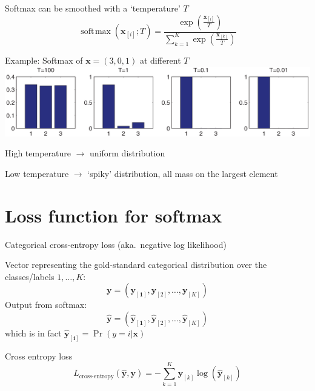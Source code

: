 \documentclass[12pt,aspectratio=169,handout]{beamer}
\DeclareMathOperator*{\softmax}{soft\!\max}
\begin{document}
\begin{frame}{Softmax can be smoothed with a `temperature' $T$}
	\vspace{-1em}
	$$
	\softmax (\bm{x}_{[i]}; T) = \frac{
		\exp(\frac{\bm{x}_{[i]}}{T})
	}{
		\sum_{k=1}^{K} \exp(
		\frac{\bm{x}_{[k]}}{T})
	}
	$$
	
	\pause
	\begin{block}{Example: Softmax of $\bm{x} = (3, 0, 1)$ at different $T$}
		\includegraphics[width=0.95\linewidth]{img/temperatures.png}
		
		High temperature $\to$ uniform distribution
		
		Low temperature $\to$ `spiky' distribution, all mass on the largest element
		
	\end{block}


	
\end{frame}


\section{Loss function for softmax}

\begin{frame}{Categorical cross-entropy loss (aka.\ negative log likelihood)}
	
	Vector representing the gold-standard categorical distribution over the classes/labels $1, \ldots, K$:
	$$
	\bm{y} = (\bm{y_{[1]}}, \bm{y}_{[2]}, \ldots, \bm{y}_{[K]})
	$$
	Output from softmax:
	$$
	\bm{\hat{y}} = (\bm{\hat{y}_{[1]}}, \bm{\hat{y}}_{[2]}, \ldots, \bm{\hat{y}}_{[K]})
	$$
	which is in fact $\bm{\hat{y}_{[i]}} = \Pr(y = i| \bm{x})$
	
	
	\begin{block}{Cross entropy loss}
		$$
		L_{\text{cross-entropy}} (\bm{\hat{y}, \bm{y}}) =
		- \sum_{k = 1}^{K} \bm{y}_{[k]} \log \left(  \bm{\hat{y}}_{[k]} \right)
		$$	
	\end{block}	
\end{frame}
\end{document}
